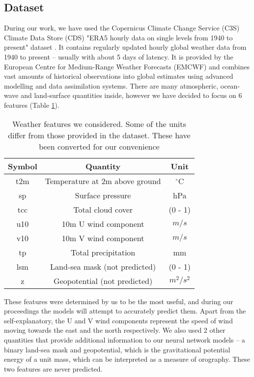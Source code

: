 \subsection{Dataset}
During our work, we have used the Copernicus Climate Change Service (C3S) Climate Data Store (CDS) "ERA5 hourly data on single levels from 1940 to present" dataset \cite{ERA5}. It contains regularly updated hourly global weather data from 1940 to present -- usually with about 5 days of latency. It is provided by the European Centre for Medium-Range Weather Forecasts (EMCWF) and combines vast amounts of historical observations into global estimates using advanced modelling and data assimilation systems. There are many atmospheric, ocean-wave and land-surface quantities inside, however we have decided to focus on 6 features (Table \ref{tab:data_features}).

\begin{table}[!ht]
\centering
\begin{tabular}{|c|c|c|}
     \hline
     Symbol & Quantity & Unit \\
     \hline
     t2m & Temperature at 2m above ground & $^{\circ}$C \\
     sp & Surface pressure & hPa \\
     tcc & Total cloud cover & (0 - 1) \\
     u10 & 10m U wind component & $m/s$ \\
     v10 & 10m V wind component & $m/s$ \\
     tp & Total precipitation & mm \\
     \hline
     lsm & Land-sea mask (not predicted) & (0 - 1) \\
     z & Geopotential (not predicted) & $m^2/s^2$ \\
     \hline
\end{tabular}
\caption{Weather features we considered. Some of the units differ from those provided in the dataset. These have been converted for our convenience}
\label{tab:data_features}
\end{table}

These features were determined by us to be the most useful, and during our proceedings the models will attempt to accurately predict them. Apart from the self-explanatory, the U and V wind components represent the speed of wind moving towards the east and the north respectively. We also used 2 other quantities that provide additional information to our neural network models -- a binary land-sea mask and geopotential, which is the gravitational potential energy of a unit mass, which can be interpreted as a measure of orography. These two features are never predicted.

